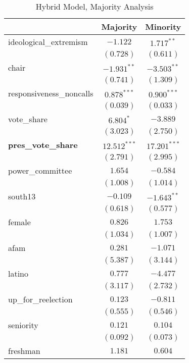 \documentclass[12pt]{article}
\begin{document}
\begin{table}
	\begin{center}
		\caption{Hybrid Model, Majority Analysis}
		\begin{tabular}{l c c }
			\hline
			& Majority & Minority \\
			\hline
			ideological\_extremism   & $-1.122$       & $1.717^{**}$   \\
			& $(0.728)$      & $(0.611)$      \\
			chair                    & $-1.931^{**}$  & $-3.503^{**}$  \\
			& $(0.741)$      & $(1.309)$      \\
			responsiveness\_noncalls & $0.878^{***}$  & $0.900^{***}$  \\
			& $(0.039)$      & $(0.033)$      \\
			vote\_share              & $6.804^{*}$    & $-3.889$       \\
			& $(3.023)$      & $(2.750)$      \\
			\textbf{pres\_vote\_share}        & $12.512^{***}$ & $17.201^{***}$ \\
			& $(2.791)$      & $(2.995)$      \\
			power\_committee         & $1.654$        & $-0.584$       \\
			& $(1.008)$      & $(1.014)$      \\
			south13                  & $-0.109$       & $-1.643^{**}$  \\
			& $(0.618)$      & $(0.577)$      \\
			female                   & $0.826$        & $1.753$        \\
			& $(1.034)$      & $(1.007)$      \\
			afam                     & $0.281$        & $-1.071$       \\
			& $(5.387)$      & $(3.144)$      \\
			latino                   & $0.777$        & $-4.477$       \\
			& $(3.117)$      & $(2.732)$      \\
			up\_for\_reelection      & $0.123$        & $-0.811$       \\
			& $(0.555)$      & $(0.546)$      \\
			seniority                & $0.121$        & $0.104$        \\
			& $(0.092)$      & $(0.073)$      \\
			freshman                 & $1.181$        & $0.604$        \\

\end{tabular}
\end{center}
\end{table}
\end{document}
